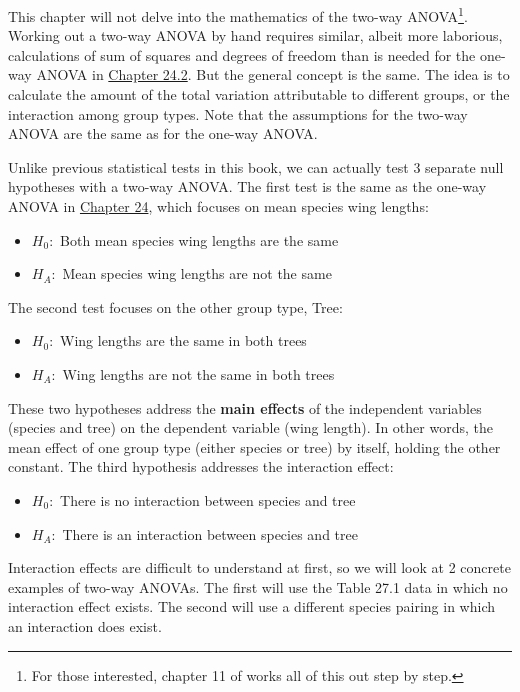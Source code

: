 \documentclass[
  openany]{krantz}
\providecommand{\tightlist}{%
  \setlength{\itemsep}{0pt}\setlength{\parskip}{0pt}}
\begin{document}
This chapter will not delve into the mathematics of the two-way ANOVA\footnote{For those interested, chapter 11 of \citet{Sokal1995} works all of this out step by step.}.
Working out a two-way ANOVA by hand requires similar, albeit more laborious, calculations of sum of squares and degrees of freedom than is needed for the one-way ANOVA in \protect\hyperlink{one-way-anova}{Chapter 24.2}.
But the general concept is the same.
The idea is to calculate the amount of the total variation attributable to different groups, or the interaction among group types.
Note that the assumptions for the two-way ANOVA are the same as for the one-way ANOVA.

Unlike previous statistical tests in this book, we can actually test 3 separate null hypotheses with a two-way ANOVA.
The first test is the same as the one-way ANOVA in \protect\hyperlink{Chapter_24}{Chapter 24}, which focuses on mean species wing lengths:

\begin{itemize}
\tightlist
\item
  \(H_{0}:\) Both mean species wing lengths are the same
\item
  \(H_{A}:\) Mean species wing lengths are not the same
\end{itemize}

The second test focuses on the other group type, Tree:

\begin{itemize}
\tightlist
\item
  \(H_{0}:\) Wing lengths are the same in both trees
\item
  \(H_{A}:\) Wing lengths are not the same in both trees
\end{itemize}

These two hypotheses address the \textbf{main effects} of the independent variables (species and tree) on the dependent variable (wing length).
In other words, the mean effect of one group type (either species or tree) by itself, holding the other constant.
The third hypothesis addresses the interaction effect:

\begin{itemize}
\tightlist
\item
  \(H_{0}:\) There is no interaction between species and tree
\item
  \(H_{A}:\) There is an interaction between species and tree
\end{itemize}

Interaction effects are difficult to understand at first, so we will look at 2 concrete examples of two-way ANOVAs.
The first will use the Table 27.1 data in which no interaction effect exists.
The second will use a different species pairing in which an interaction does exist.
\end{document}
